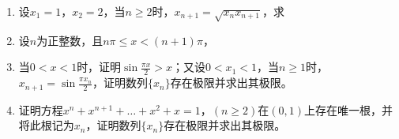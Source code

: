 \begin{enumerate}[{例}1.]
    \item 设$x_1=1$，$x_2=2$，当$n\geq 2$时，$x_{n+1}=\sqrt{x_n x_{n+1}}$，求
    \item 设$n$为正整数，且$n \pi \leq x < (n+1) \pi$，
    \item 当$0<x<1$时，证明$\sin \frac{\pi x}{2} > x$；又设$0<x_1<1$，当$n\geq 1$时，$x_{n+1}=\sin\frac{\pi x_n}{2}$，证明数列$\{x_n\}$存在极限并求出其极限。
    \item 证明方程$x^n+x^{n+1}+\dots+x^2+x=1$，$(n\geq 2)$在$(0,1)$上存在唯一根，并将此根记为$x_n$，证明数列$\{x_n\}$存在极限并求出其极限。
\end{enumerate}
